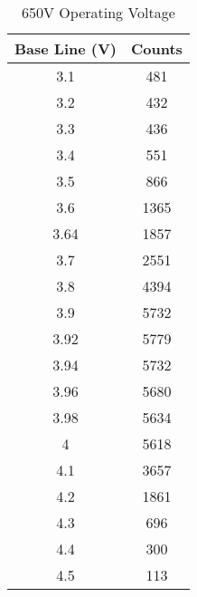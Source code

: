 \begin{table}[]
	\centering
	\begin{tabular}{|c|c|}
	\hline
	\textbf{Base Line (V)} & \textbf{Counts} \\ \hline
	3.1 & 481 \\ \hline
	3.2 & 432 \\ \hline
	3.3 & 436 \\ \hline
	3.4 & 551 \\ \hline
	3.5 & 866 \\ \hline
	3.6 & 1365 \\ \hline
	3.64 & 1857 \\ \hline
	3.7 & 2551 \\ \hline
	3.8 & 4394 \\ \hline
	3.9 & 5732 \\ \hline
	3.92 & 5779 \\ \hline
	3.94 & 5732 \\ \hline
	3.96 & 5680 \\ \hline
	3.98 & 5634 \\ \hline
	4 & 5618 \\ \hline
	4.1 & 3657 \\ \hline
	4.2 & 1861 \\ \hline
	4.3 & 696 \\ \hline
	4.4 & 300 \\ \hline
	4.5 & 113 \\ \hline
	\end{tabular}
	\caption{650V Operating Voltage}
	\label{tab:sca650}
\end{table}